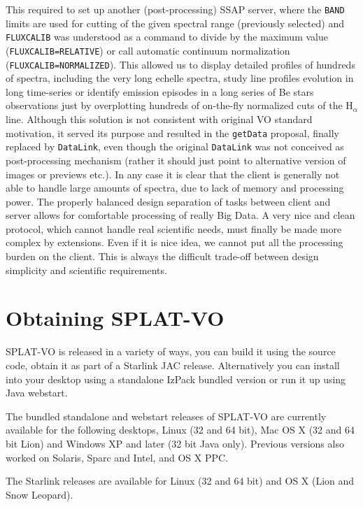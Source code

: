 \documentclass[final,authoryear,5p,times,twocolumn]{elsarticle}
\begin{document}
This required to set up another (post-processing) SSAP server, where
the \texttt{BAND} limits are used for cutting of the given spectral
range (previously selected) and \texttt{FLUXCALIB} was understood as a
command to divide by the maximum value (\texttt{FLUXCALIB=RELATIVE})
or call automatic continuum normalization
(\texttt{FLUXCALIB=NORMALIZED}).  This allowed us to display detailed
profiles of hundreds of spectra, including the very long echelle
spectra, study line profiles evolution in long time-series or identify
emission episodes in a long series of Be stars observations just by
overplotting hundreds of on-the-fly normalized cuts of the H$_\alpha$
line.  Although this solution is not consistent with original VO
standard motivation, it served its purpose and resulted in the
\texttt{getData} proposal, finally replaced by \texttt{DataLink}, even though
the original \texttt{DataLink} was not conceived as post-processing mechanism
(rather it should just point to alternative version of images or
previews etc.).  In any case it is clear that the client is generally
not able to handle large amounts of spectra, due to lack of memory and
processing power. The properly balanced design separation of tasks
between client and server allows for comfortable processing of really
Big Data.  A very nice and clean protocol, which cannot handle real
scientific needs, must finally be made more complex by
extensions. Even if it is nice idea, we cannot put all the processing
burden on the client.  This is always the difficult trade-off between
design simplicity and scientific requirements.


\section{Obtaining SPLAT-VO}

SPLAT-VO is released in a variety of ways, you can build it using the source
code, obtain it as part of a Starlink JAC release. Alternatively you can
install into your desktop using a standalone IzPack bundled version or run it
up using Java webstart.

The bundled standalone and webstart releases of SPLAT-VO are currently
available for the following desktops, Linux (32 and 64 bit), Mac OS X (32 and
64 bit Lion) and Windows XP and later (32 bit Java only). Previous versions
also worked on Solaris, Sparc and Intel, and OS X PPC.

The Starlink releases
\citep[e.g.,][]{currie_adassxxiii,2013ASPC..475..247B} are available
for Linux (32 and 64 bit) and OS X (Lion and Snow Leopard).
\end{document}
